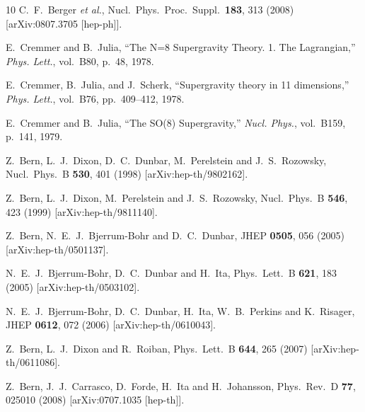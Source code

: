 \documentclass[12pt]{article}
\begin{document}
\begin{thebibliography}{10}
 C.~F.~Berger {\it et al.},
  Nucl.\ Phys.\ Proc.\ Suppl.\  {\bf 183}, 313 (2008)
  [arXiv:0807.3705 [hep-ph]].

E.~Cremmer and B.~Julia, ``{The N=8 Supergravity Theory. 1. The Lagrangian},''
  {\em Phys. Lett.}, vol.~B80, p.~48, 1978.

E.~Cremmer, B.~Julia, and J.~Scherk, ``{Supergravity theory in 11
  dimensions},'' {\em Phys. Lett.}, vol.~B76, pp.~409--412, 1978.

E.~Cremmer and B.~Julia, ``{The SO(8) Supergravity},'' {\em Nucl. Phys.},
  vol.~B159, p.~141, 1979.

  Z.~Bern, L.~J.~Dixon, D.~C.~Dunbar, M.~Perelstein and J.~S.~Rozowsky,
  Nucl.\ Phys.\  B {\bf 530}, 401 (1998)
  [arXiv:hep-th/9802162].

  Z.~Bern, L.~J.~Dixon, M.~Perelstein and J.~S.~Rozowsky,
  Nucl.\ Phys.\  B {\bf 546}, 423 (1999)
  [arXiv:hep-th/9811140].

 Z.~Bern, N.~E.~J.~Bjerrum-Bohr and D.~C.~Dunbar,
  JHEP {\bf 0505}, 056 (2005)
  [arXiv:hep-th/0501137].

  N.~E.~J.~Bjerrum-Bohr, D.~C.~Dunbar and H.~Ita,
  Phys.\ Lett.\  B {\bf 621}, 183 (2005)
  [arXiv:hep-th/0503102].

  N.~E.~J.~Bjerrum-Bohr, D.~C.~Dunbar, H.~Ita, W.~B.~Perkins and K.~Risager,
  JHEP {\bf 0612}, 072 (2006)
  [arXiv:hep-th/0610043].

  Z.~Bern, L.~J.~Dixon and R.~Roiban,
  Phys.\ Lett.\  B {\bf 644}, 265 (2007)
  [arXiv:hep-th/0611086].

 Z.~Bern, J.~J.~Carrasco, D.~Forde, H.~Ita and H.~Johansson,
  Phys.\ Rev.\  D {\bf 77}, 025010 (2008)
  [arXiv:0707.1035 [hep-th]].


\end{thebibliography}
\end{document}
